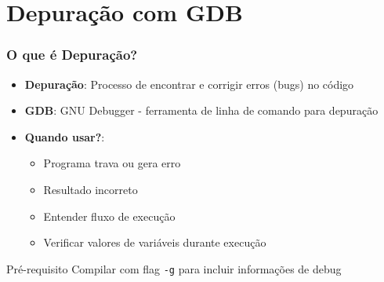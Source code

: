 \documentclass[aspectratio=169]{beamer}
\begin{document}
\section{Depuração com GDB}

\begin{frame}
\frametitle{O que é Depuração?}
\begin{itemize}
    \item \textbf{Depuração}: Processo de encontrar e corrigir erros (bugs) no código
    \item \textbf{GDB}: GNU Debugger - ferramenta de linha de comando para depuração
    \item \textbf{Quando usar?}:
    \begin{itemize}
        \item Programa trava ou gera erro
        \item Resultado incorreto
        \item Entender fluxo de execução
        \item Verificar valores de variáveis durante execução
    \end{itemize}
\end{itemize}

\begin{block}{Pré-requisito}
Compilar com flag \texttt{-g} para incluir informações de debug
\end{block}
\end{frame}
\end{document}
